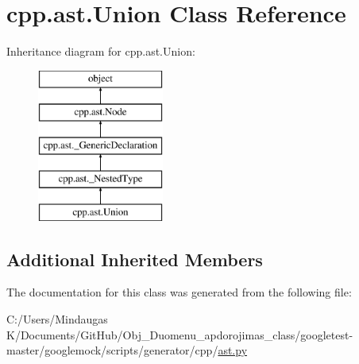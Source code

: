 \hypertarget{classcpp_1_1ast_1_1_union}{}\section{cpp.\+ast.\+Union Class Reference}
\label{classcpp_1_1ast_1_1_union}
Inheritance diagram for cpp.\+ast.\+Union\+:\begin{figure}[H]
\begin{center}
\leavevmode
\includegraphics[height=5.000000cm]{d4/d94/classcpp_1_1ast_1_1_union}
\end{center}
\end{figure}
\subsection*{Additional Inherited Members}


The documentation for this class was generated from the following file\+:\begin{DoxyCompactItemize}
\item 
C\+:/\+Users/\+Mindaugas K/\+Documents/\+Git\+Hub/\+Obj\+\_\+\+Duomenu\+\_\+apdorojimas\+\_\+class/googletest-\/master/googlemock/scripts/generator/cpp/\mbox{\hyperlink{googletest-master_2googlemock_2scripts_2generator_2cpp_2ast_8py}{ast.\+py}}\end{DoxyCompactItemize}
